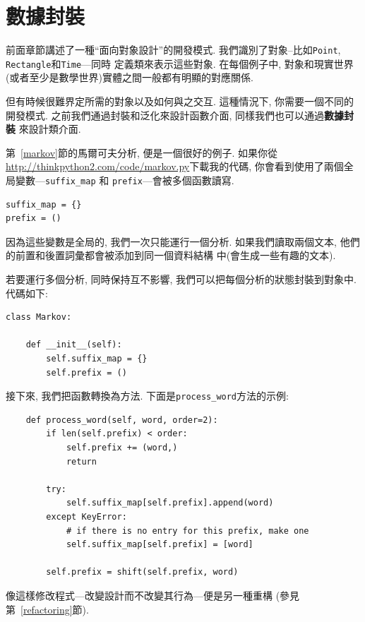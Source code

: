 \documentclass[10pt]{book}
\begin{document}
\section{數據封裝}

前面章節講述了一種``面向對象設計''的開發模式. 
我們識別了對象--比如{\tt Point}, {\tt Rectangle}和{\tt Time}---同時
定義類來表示這些對象. 
在每個例子中, 對象和現實世界(或者至少是數學世界)實體之間一般都有明顯的對應關係. 

但有時候很難界定所需的對象以及如何與之交互. 
這種情況下, 你需要一個不同的開發模式. 
之前我們通過封裝和泛化來設計函數介面, 同樣我們也可以通過{\bf 數據封裝}
來設計類介面. 

第~\ref{markov}節的馬爾可夫分析, 便是一個很好的例子. 
如果你從\url{http://thinkpython2.com/code/markov.py}下載我的代碼, 
你會看到使用了兩個全局變數---\verb"suffix_map" 和
\verb"prefix"---會被多個函數讀寫. 

\begin{verbatim}
suffix_map = {}        
prefix = ()            
\end{verbatim}

因為這些變數是全局的, 我們一次只能運行一個分析. 
如果我們讀取兩個文本, 他們的前置和後置詞彙都會被添加到同一個資料結構
中(會生成一些有趣的文本). 

若要運行多個分析, 同時保持互不影響, 我們可以把每個分析的狀態封裝到對象中. 
代碼如下:

\begin{verbatim}
class Markov:

    def __init__(self):
        self.suffix_map = {}
        self.prefix = ()    
\end{verbatim}

接下來, 我們把函數轉換為方法. 
下面是\verb"process_word"方法的示例:

\begin{verbatim}
    def process_word(self, word, order=2):
        if len(self.prefix) < order:
            self.prefix += (word,)
            return

        try:
            self.suffix_map[self.prefix].append(word)
        except KeyError:
            # if there is no entry for this prefix, make one
            self.suffix_map[self.prefix] = [word]

        self.prefix = shift(self.prefix, word)        
\end{verbatim}
像這樣修改程式---改變設計而不改變其行為---便是另一種重構
(參見第~\ref{refactoring}節).
\end{document}
